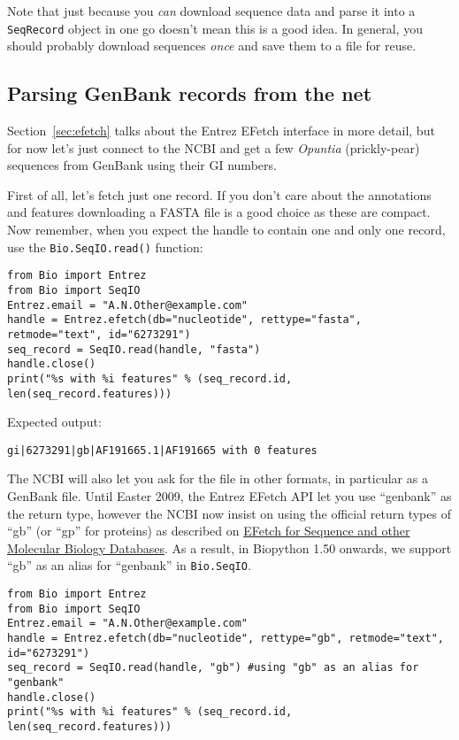 \documentclass{report}
\begin{document}
Note that just because you \emph{can} download sequence data and parse it into
a \verb|SeqRecord| object in one go doesn't mean this is a good idea.
In general, you should probably download sequences \emph{once} and save them to
a file for reuse.

\subsection{Parsing GenBank records from the net}
\label{sec:SeqIO_GenBank_Online}
Section~\ref{sec:efetch} talks about the Entrez EFetch interface in more detail,
but for now let's just connect to the NCBI and get a few \textit{Opuntia} (prickly-pear)
sequences from GenBank using their GI numbers.

First of all, let's fetch just one record.  If you don't care about the
annotations and features downloading a FASTA file is a good choice as these
are compact.  Now remember, when you expect the handle to contain one and
only one record, use the \verb|Bio.SeqIO.read()| function:

\begin{verbatim}
from Bio import Entrez
from Bio import SeqIO
Entrez.email = "A.N.Other@example.com"
handle = Entrez.efetch(db="nucleotide", rettype="fasta", retmode="text", id="6273291")
seq_record = SeqIO.read(handle, "fasta")
handle.close()
print("%s with %i features" % (seq_record.id, len(seq_record.features)))
\end{verbatim}

\noindent Expected output:

\begin{verbatim}
gi|6273291|gb|AF191665.1|AF191665 with 0 features
\end{verbatim}

The NCBI will also let you ask for the file in other formats, in particular as
a GenBank file. Until Easter 2009, the Entrez EFetch API let you use ``genbank''
as the return type, however the NCBI now insist on using the official
return types of ``gb'' (or ``gp'' for proteins) as described on
\href{http://www.ncbi.nlm.nih.gov/entrez/query/static/efetchseq_help.html}
{EFetch for Sequence and other Molecular Biology Databases}.
As a result, in Biopython 1.50 onwards, we support ``gb'' as an
alias for ``genbank'' in \verb|Bio.SeqIO|.

\begin{verbatim}
from Bio import Entrez
from Bio import SeqIO
Entrez.email = "A.N.Other@example.com"
handle = Entrez.efetch(db="nucleotide", rettype="gb", retmode="text", id="6273291")
seq_record = SeqIO.read(handle, "gb") #using "gb" as an alias for "genbank"
handle.close()
print("%s with %i features" % (seq_record.id, len(seq_record.features)))
\end{verbatim}
\end{document}
